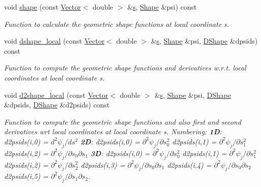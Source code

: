 \begin{DoxyCompactItemize}
void \hyperlink{classoomph_1_1QHermiteElement_a0e5d50fb86a7eb4c8a30ca8392d5a216}{shape} (const \hyperlink{classoomph_1_1Vector}{Vector}$<$ double $>$ \&\hyperlink{cfortran_8h_ab7123126e4885ef647dd9c6e3807a21c}{s}, \hyperlink{classoomph_1_1Shape}{Shape} \&psi) const
\begin{DoxyCompactList}\small\item\em Function to calculate the geometric shape functions at local coordinate s. \end{DoxyCompactList}\item 
void \hyperlink{classoomph_1_1QHermiteElement_a8b44fee3bf2a9d1b7587b56e434b594e}{dshape\+\_\+local} (const \hyperlink{classoomph_1_1Vector}{Vector}$<$ double $>$ \&\hyperlink{cfortran_8h_ab7123126e4885ef647dd9c6e3807a21c}{s}, \hyperlink{classoomph_1_1Shape}{Shape} \&psi, \hyperlink{classoomph_1_1DShape}{D\+Shape} \&dpsids) const
\begin{DoxyCompactList}\small\item\em Function to compute the geometric shape functions and derivatives w.\+r.\+t. local coordinates at local coordinate s. \end{DoxyCompactList}\item 
void \hyperlink{classoomph_1_1QHermiteElement_aef2bb1abc43f207edd57f6e38cbbe297}{d2shape\+\_\+local} (const \hyperlink{classoomph_1_1Vector}{Vector}$<$ double $>$ \&\hyperlink{cfortran_8h_ab7123126e4885ef647dd9c6e3807a21c}{s}, \hyperlink{classoomph_1_1Shape}{Shape} \&psi, \hyperlink{classoomph_1_1DShape}{D\+Shape} \&dpsids, \hyperlink{classoomph_1_1DShape}{D\+Shape} \&d2psids) const
\begin{DoxyCompactList}\small\item\em Function to compute the geometric shape functions and also first and second derivatives wrt local coordinates at local coordinate s. Numbering\+: {\bfseries 1D}\+: d2psids(i,0) = $ d^2 \psi_j / d s^2 $ {\bfseries 2D}\+: d2psids(i,0) = $ \partial^2 \psi_j / \partial s_0^2 $ d2psids(i,1) = $ \partial^2 \psi_j / \partial s_1^2 $ d2psids(i,2) = $ \partial^2 \psi_j / \partial s_0 \partial s_1 $ {\bfseries 3D}\+: d2psids(i,0) = $ \partial^2 \psi_j / \partial s_0^2 $ d2psids(i,1) = $ \partial^2 \psi_j / \partial s_1^2 $ d2psids(i,2) = $ \partial^2 \psi_j / \partial s_2^2 $ d2psids(i,3) = $ \partial^2 \psi_j / \partial s_0 \partial s_1 $ d2psids(i,4) = $ \partial^2 \psi_j / \partial s_0 \partial s_2 $ d2psids(i,5) = $ \partial^2 \psi_j / \partial s_1 \partial s_2 $. \end{DoxyCompactList}\item 

\end{DoxyCompactItemize}
